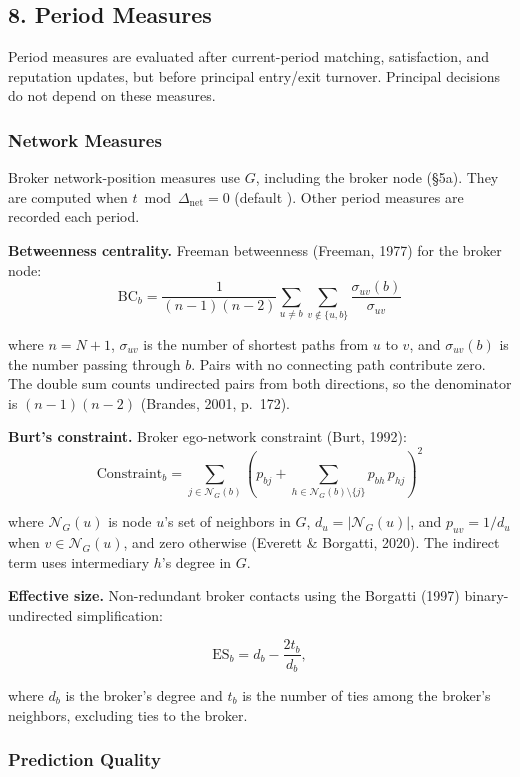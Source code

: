 \documentclass[11pt]{article}
\begin{document}
\subsection{8. Period Measures}\label{period-measures}

Period measures are evaluated after current-period matching, satisfaction, and reputation updates, but before principal entry/exit turnover. Principal decisions do not depend on these measures.

\subsubsection{Network Measures}\label{network-measures}

Broker network-position measures use \(G\), including the broker node (§5a). They are computed when \(t \bmod \Delta_{\mathrm{net}}=0\) (default ). Other period measures are recorded each period.

\textbf{Betweenness centrality.} Freeman betweenness (Freeman, 1977) for the broker node:
\[\mathrm{BC}_b = \frac{1}{(n-1)(n-2)} \sum_{u \neq b} \sum_{v \notin \{u,b\}} \frac{\sigma_{uv}(b)}{\sigma_{uv}}\]

where \(n = N+1\), \(\sigma_{uv}\) is the number of shortest paths from \(u\) to \(v\), and \(\sigma_{uv}(b)\) is the number passing through \(b\). Pairs with no connecting path contribute zero. The double sum counts undirected pairs from both directions, so the denominator is \((n-1)(n-2)\) (Brandes, 2001, p.~172).

\textbf{Burt's constraint.} Broker ego-network constraint (Burt, 1992):
\[\mathrm{Constraint}_b = \sum_{j\in\mathcal N_G(b)} \left(p_{bj} + \sum_{h\in\mathcal N_G(b)\setminus\{j\}}
p_{bh}\, p_{hj}\right)^2\]

where \(\mathcal N_G(u)\) is node \(u\)'s set of neighbors in \(G\), \(d_u=|\mathcal N_G(u)|\), and \(p_{uv}=1/d_u\) when \(v\in\mathcal N_G(u)\), and zero otherwise (Everett \& Borgatti, 2020). The indirect term uses intermediary \(h\)'s degree in \(G\).

\textbf{Effective size.} Non-redundant broker contacts using the Borgatti (1997) binary-undirected simplification:

\[\text{ES}_b = d_b - \frac{2t_b}{d_b},\]

where \(d_b\) is the broker's degree and \(t_b\) is the number of ties among the broker's neighbors, excluding ties to the broker.

\subsubsection{Prediction Quality}\label{prediction-quality}
\end{document}
